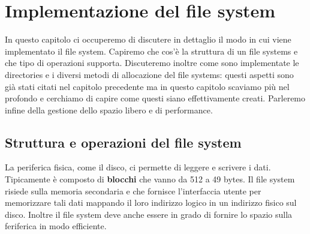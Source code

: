 \pagebreak
\section{Implementazione del file system}
In questo capitolo ci occuperemo di discutere in dettaglio il modo in cui viene implementato il file system. Capiremo che cos'è la struttura di un file systems e che tipo di operazioni supporta. Discuteremo inoltre come sono implementate le directories e i diversi metodi di allocazione del file systems: questi aspetti sono già stati citati nel capitolo precedente ma in questo capitolo scaviamo più nel profondo e cerchiamo di capire come questi siano effettivamente creati. Parleremo infine della gestione dello spazio libero e di performance. 

\subsection{Struttura e operazioni del file system}
La periferica fisica, come il disco, ci permette di leggere e scrivere i dati. Tipicamente è composto di \textbf{blocchi} che vanno da 512 a 49 bytes. Il file system risiede sulla memoria secondaria e che fornisce l'interfaccia utente per memorizzare tali dati mappando il loro indirizzo logico in un indirizzo fisico sul disco. Inoltre il file system deve anche essere in grado di fornire lo spazio sulla feriferica in modo efficiente. 
% 

